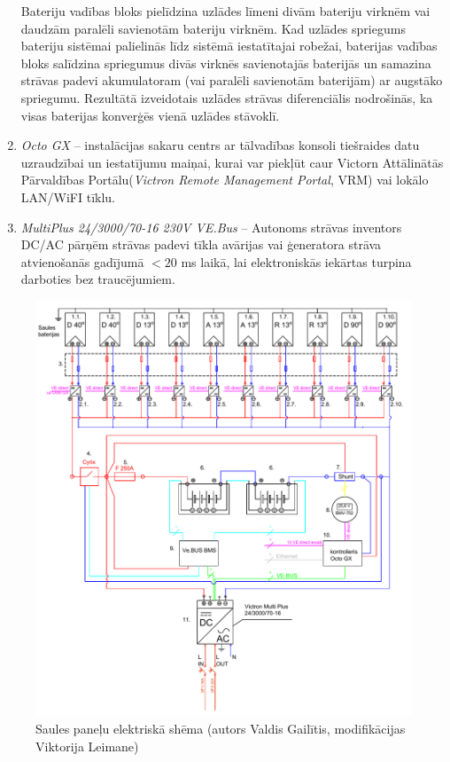 \begin{enumerate}
Bateriju vadības bloks pielīdzina uzlādes līmeni divām bateriju virknēm vai daudzām paralēli savienotām bateriju virknēm. Kad uzlādes spriegums bateriju sistēmai palielinās līdz sistēmā iestatītajai robežai, baterijas vadības bloks salīdzina spriegumus divās virknēs savienotajās baterijās un samazina strāvas padevi akumulatoram (vai paralēli savienotām baterijām) ar augstāko spriegumu. Rezultātā izveidotais uzlādes strāvas diferenciālis nodrošinās, ka visas baterijas konverģēs vienā uzlādes stāvoklī.
\item \emph{Octo GX} -- instalācijas sakaru centrs ar tālvadības konsoli tiešraides datu uzraudzībai un iestatījumu maiņai, kurai var piekļūt caur Victorn Attālinātās Pārvaldības Portālu(\textit{Victron Remote Management Portal}, VRM) vai lokālo LAN/WiFI tīklu.
\item \emph{MultiPlus 24/3000/70-16 230V VE.Bus}  --
Autonoms strāvas inventors DC/AC pārņēm strāvas padevi tīkla avārijas vai ģeneratora strāva atvienošanās gadījumā $<20$ ms laikā, lai elektroniskās iekārtas turpina darboties bez traucējumiem. 
\end{enumerate}

\begin{figure}[h]
    \centering
    \includegraphics[width=0.7\linewidth]{figures/misc/shema.pdf}
    \caption{Saules paneļu elektriskā shēma (autors Valdis Gailītis, modifikācijas Viktorija Leimane)}
    \label{fig:shema}
\end{figure}

